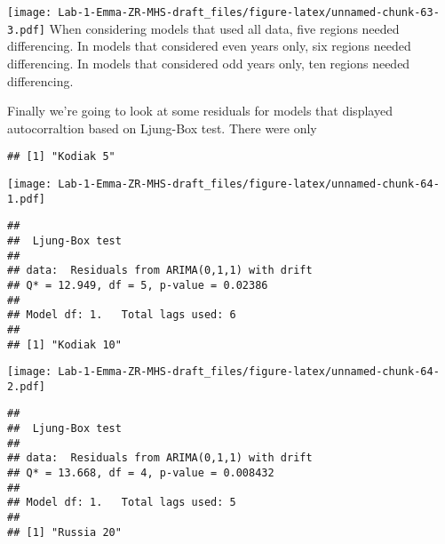 \documentclass[
]{article}
\newenvironment{Shaded}{\begin{snugshade}}{\end{snugshade}}
\newcommand{\CommentTok}[1]{\textcolor[rgb]{0.56,0.35,0.01}{\textit{#1}}}
\newcommand{\ControlFlowTok}[1]{\textcolor[rgb]{0.13,0.29,0.53}{\textbf{#1}}}
\newcommand{\DecValTok}[1]{\textcolor[rgb]{0.00,0.00,0.81}{#1}}
\newcommand{\FunctionTok}[1]{\textcolor[rgb]{0.00,0.00,0.00}{#1}}
\newcommand{\NormalTok}[1]{#1}
\newcommand{\OtherTok}[1]{\textcolor[rgb]{0.56,0.35,0.01}{#1}}
\newcommand{\SpecialCharTok}[1]{\textcolor[rgb]{0.00,0.00,0.00}{#1}}
\begin{document}
\texttt{[image: Lab-1-Emma-ZR-MHS-draft\_files/figure-latex/unnamed-chunk-63-3.pdf]}
When considering models that used all data, five regions needed
differencing. In models that considered even years only, six regions
needed differencing. In models that considered odd years only, ten
regions needed differencing.

Finally we're going to look at some residuals for models that displayed
autocorraltion based on Ljung-Box test. There were only

\begin{Shaded}
\end{Shaded}

\begin{verbatim}
## [1] "Kodiak 5"
\end{verbatim}

\texttt{[image: Lab-1-Emma-ZR-MHS-draft\_files/figure-latex/unnamed-chunk-64-1.pdf]}

\begin{verbatim}
## 
##  Ljung-Box test
## 
## data:  Residuals from ARIMA(0,1,1) with drift
## Q* = 12.949, df = 5, p-value = 0.02386
## 
## Model df: 1.   Total lags used: 6
## 
## [1] "Kodiak 10"
\end{verbatim}

\texttt{[image: Lab-1-Emma-ZR-MHS-draft\_files/figure-latex/unnamed-chunk-64-2.pdf]}

\begin{verbatim}
## 
##  Ljung-Box test
## 
## data:  Residuals from ARIMA(0,1,1) with drift
## Q* = 13.668, df = 4, p-value = 0.008432
## 
## Model df: 1.   Total lags used: 5
## 
## [1] "Russia 20"
\end{verbatim}
\end{document}
